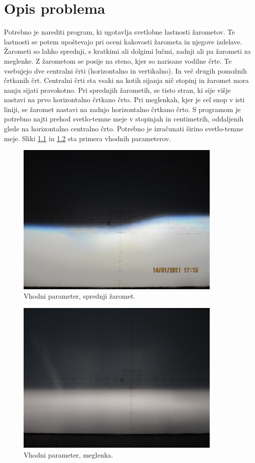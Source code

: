 \documentclass[oneside, a4paper, 12pt]{book}
\begin{document}
\chapter{Opis problema}
Potrebno je narediti program, ki ugotavlja svetlobne lastnosti žarometov. Te lastnosti se potem upoštevajo pri oceni kakovosti žarometa in njegove izdelave. Žarometi so lahko sprednji, s kratkimi ali dolgimi lučmi, zadnji ali pa žarometi za meglenke.
Z žarometom se posije na steno, kjer so narisane vodilne črte. Te vsebujejo dve centralni črti (horizontalno in vertikalno). In več drugih pomožnih črtkanih črt. Centralni črti sta vsaki na kotih sijanja nič stopinj in žaromet mora nanju sijati pravokotno. Pri sprednjih žarometih, se tisto stran, ki sije višje nastavi na prvo horizontalno črtkano črto. Pri meglenkah, kjer je cel snop v isti liniji, se žaromet nastavi na zadnjo horizontalno črtkano črto. 
S programom je potrebno najti prehod svetlo-temne meje v stopinjah in centimetrih, oddaljenih glede na horizontalno centralno črto. Potrebno je izračunati širino svetlo-temne meje.
Sliki \ref{pic:vhp1} in \ref{pic:vhp2} sta primera vhodnih parameterov.

\begin{figure}
\begin{center}
\includegraphics[width=10cm]{slike/original.jpg}
\end{center}
\caption{Vhodni parameter, sprednji žaromet.}
\label{pic:vhp1}
\end{figure}

\begin{figure}
\begin{center}
\includegraphics[width=10cm]{slike/levi3.JPG}
\end{center}
\caption{Vhodni parameter, meglenka.}
\label{pic:vhp2}
\end{figure}
\end{document}
